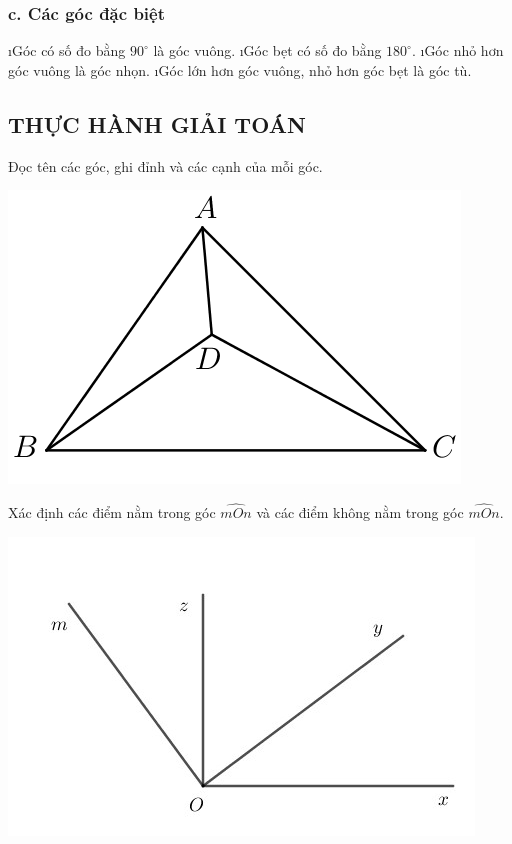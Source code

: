 \subsubsection*{c. Các góc đặc biệt}
\begin{enumerate}[--,leftmargin=*]
	\i Góc có số đo bằng ${{90}^\circ}$ là góc vuông.
	\i Góc bẹt có số đo bằng ${{180}^\circ}$.
	\i Góc nhỏ hơn góc vuông là góc nhọn.
	\i Góc lớn hơn góc vuông, nhỏ hơn góc bẹt là góc tù.
\end{enumerate}
\subsection{THỰC HÀNH GIẢI TOÁN}
\begin{vd}
	Đọc tên các góc, ghi đỉnh và các cạnh của mỗi góc. 
	\begin{center}
		\includegraphics[width= 0.5\linewidth]{vd-30-6}
	\end{center}
\end{vd}
\begin{vd}
	Xác định các điểm nằm trong góc $\widehat{mOn}$ và các điểm không nằm trong góc $\widehat{mOn}$.
	\begin{center}
		\includegraphics[width= 0.5\linewidth]{vd-30-7}
	\end{center}
\end{vd}

